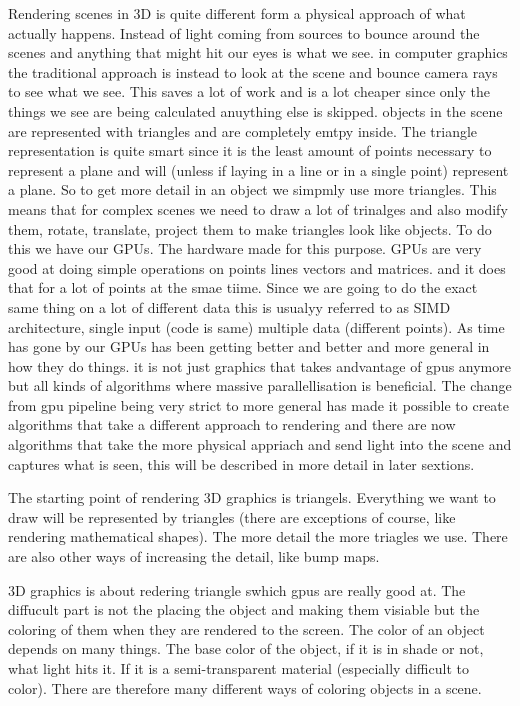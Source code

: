 Rendering scenes in 3D is quite different form a physical approach of what actually happens. Instead of light coming from sources to bounce around the scenes and anything that might hit our eyes is what we see. in computer graphics the traditional approach is instead to look at the scene and bounce camera rays to see what we see. This saves a lot of work and is a lot cheaper since only the things we see are being calculated anuything else is skipped. objects in the scene are represented with triangles and are completely emtpy inside. 
The triangle representation is quite smart since it is the least amount of points necessary to represent a plane and will (unless if laying in a line or in a single point) represent a plane. So to get more detail in an object we simpmly use more triangles. This means that for complex scenes we need to draw a lot of trinalges and also modify them, rotate, translate, project them to make triangles look like objects. 
To do this we have our GPUs. The hardware made for this purpose. GPUs are very good at doing simple operations on points lines vectors and matrices. and it does that for a lot of points at the smae tiime. Since we are going to do the exact same thing on a lot of different data this is usualyy referred to as SIMD architecture, single input (code is same) multiple data (different points).
As time has gone by our GPUs has been getting better and better and more general in how they do things. it is not just graphics that takes andvantage of gpus anymore but all kinds of algorithms where massive parallellisation is beneficial. 
The change from gpu pipeline being very strict to more general has made it possible to create algorithms that take a different approach to rendering and there are now algorithms that take the more physical appriach and send light into the scene and captures what is seen, this will be described in more detail in later sextions. 



The starting point of rendering 3D graphics is triangels. Everything we want to draw will be represented by triangles (there are exceptions of course, like rendering mathematical shapes). The more detail the more triagles we use. There are also other ways of increasing the detail, like bump maps. 

3D graphics is about redering triangle swhich gpus are really good at. The diffucult part is not the placing the object and making them visiable but the coloring of them when they are rendered to the screen. 
The color of an object depends on many things. The base color of the object, if it is in shade or not, what light hits it. If it is a semi-transparent material (especially difficult to color). There are therefore many different ways of coloring objects in a scene. 

